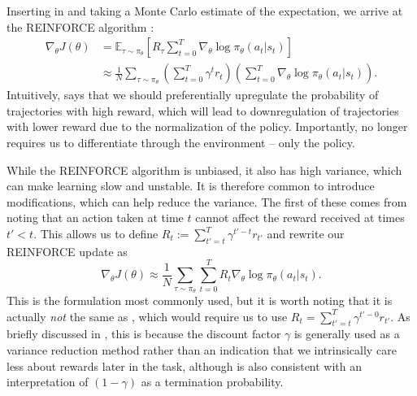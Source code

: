 Inserting  in  and taking a Monte Carlo estimate of the expectation, we arrive at the REINFORCE algorithm \citep{williams1992simple}:
\begin{align}
    \nabla_\theta J(\theta) & = \mathbb{E}_{\tau \sim \pi_\theta} \left [ R_\tau \sum_{t=0}^T \nabla_\theta \log \pi_\theta (a_t|s_t) \right ]                                         \\
                            & \approx \frac{1}{N} \sum_{\tau \sim \pi_\theta} \left ( \sum_{t=0}^T \gamma^t r_t \right ) \left ( \sum_{t=0}^T \nabla_\theta \log \pi_\theta (a_t|s_t) \right ).
    \label{eq:orig_reinforce}
\end{align}
Intuitively,  says that we should preferentially upregulate the probability of trajectories with high reward, which will lead to downregulation of trajectories with lower reward due to the normalization of the policy.
Importantly,  no longer requires us to differentiate through the environment -- only the policy.

While the REINFORCE algorithm is unbiased, it also has high variance, which can make learning slow and unstable.
It is therefore common to introduce modifications, which can help reduce the variance.
The first of these comes from noting that an action taken at time $t$ cannot affect the reward received at times $t'<t$.
This allows us to define $R_t := \sum_{t'=t}^T \gamma^{t'-t} r_{t'}$ and rewrite our REINFORCE update as
\begin{equation}
    \label{eq:reinforce}
    \nabla_\theta J(\theta) \approx \frac{1}{N} \sum_{\tau \sim \pi_\theta}  \sum_{t=0}^T R_t \nabla_\theta \log \pi_\theta (a_t|s_t).
\end{equation}
This is the formulation most commonly used, but it is worth noting that it is actually \emph{not} the same as , which would require us to use $R_t= \sum_{t'=t}^T \gamma^{t'-0} r_{t'}$.
As briefly discussed in , this is because the discount factor $\gamma$ is generally used as a variance reduction method rather than an indication that we intrinsically care less about rewards later in the task, although  is also consistent with an interpretation of $(1-\gamma)$ as a termination probability.

